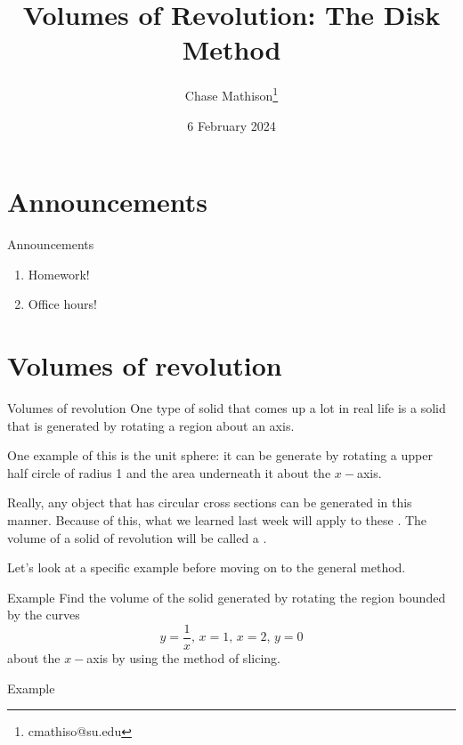 \documentclass[presentation]{beamer}
\institute[SU]{Shenandoah University}
\author{Chase Mathison\thanks{cmathiso@su.edu}}
\date{6 February 2024}
\title{Volumes of Revolution: The Disk Method}
\begin{document}
\maketitle


\section{Announcements}
\label{sec:org0febb3d}
\begin{frame}[label={sec:org202add0}]{Announcements}
\begin{enumerate}
\item Homework!
\item Office hours!
\end{enumerate}
\end{frame}

\section{Volumes of revolution}
\label{sec:org7fef7db}
\begin{frame}[label={sec:org3cb44ca}]{Volumes of revolution}
One type of solid that comes up a lot in real life is a solid that is
generated by rotating a region about an axis.

One example of this is the unit sphere: it can be generate by rotating
a upper half circle of radius 1 and the area underneath it about the
\(x-\)axis. 

Really, any object that has circular cross sections can be generated
in this manner.  Because of this, what we learned last week will apply
to these \uline{\hspace*{1in}}. The volume of a solid of revolution
will be called a \uline{\hspace*{1in}}.

Let's look at a specific example before moving on to the general
method.
\end{frame}

\begin{frame}[label={sec:org19b16d9}]{Example}
Find the volume of the solid generated by rotating the region bounded
by the curves
\[
y = \frac{1}{x},\, x = 1,\, x = 2,\, y = 0 \]
about the \(x-\)axis by using the method of slicing.
\vspace{10in}
\end{frame}

\begin{frame}[label={sec:org00e9dd0}]{Example}
\end{frame}
\end{document}
